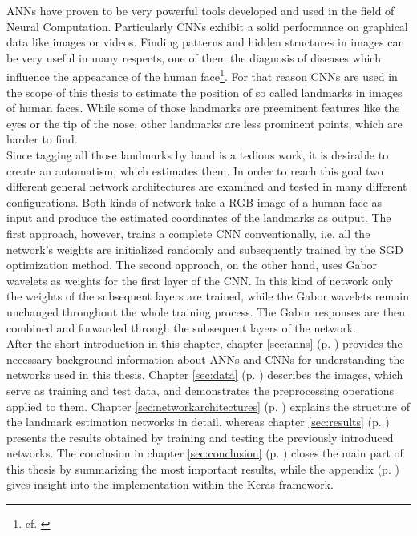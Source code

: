 \documentclass[11pt, a4paper]{article}
\newcommand\myref[1]{\ref{#1} (p. \pageref{#1})}
\begin{document}
\acp{ANN} have proven to be very powerful tools developed and used in the field of Neural Computation. Particularly \acp{CNN} exhibit a solid performance on graphical data like images or videos. Finding patterns and hidden structures in images can be very useful in many respects, one of them the diagnosis of diseases which influence the appearance of the human face\footnote{cf. \cite{ebgm}}. For that reason \acp{CNN} are used in the scope of this thesis to estimate the position of so called landmarks in images of human faces. While some of those landmarks are preeminent features like the eyes or the tip of the nose, other landmarks are less prominent points, which are harder to find.\\
Since tagging all those landmarks by hand is a tedious work, it is desirable to create an automatism, which estimates them. In order to reach this goal two different general network architectures are examined and tested in many different configurations. Both kinds of network take a \ac{RGB}-image of a human face as input and produce the estimated coordinates of the landmarks as output. The first approach, however, trains a complete \ac{CNN} conventionally, i.e. all the network's weights are initialized randomly and subsequently trained by the \ac{SGD} optimization method. The second approach, on the other hand, uses Gabor wavelets as weights for the first layer of the \ac{CNN}. In this kind of network only the weights of the subsequent layers are trained, while the Gabor wavelets remain unchanged throughout the whole training process. The Gabor responses are then combined and forwarded through the subsequent layers of the network.\\
After the short introduction in this chapter, chapter \myref{sec:anns} provides the necessary background information about \acp{ANN} and \acp{CNN} for understanding the networks used in this thesis. Chapter \myref{sec:data} describes the images, which serve as training and test data, and demonstrates the preprocessing operations applied to them. Chapter \myref{sec:networkarchitectures} explains the structure of the landmark estimation networks in detail. whereas chapter \myref{sec:results} presents the results obtained by training and testing the previously introduced networks. The conclusion in chapter \myref{sec:conclusion} closes the main part of this thesis by summarizing the most important results, while the appendix (p. \pageref{appendix}) gives insight into the implementation within the Keras framework.
\end{document}

